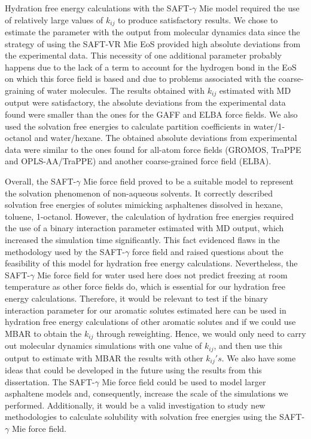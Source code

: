 Hydration free energy calculations with the SAFT-$\gamma$ Mie model required the use of relatively large values of $k_{ij}$ to produce satisfactory results. We chose to estimate the parameter with the output from molecular dynamics data since the strategy of using the SAFT-VR Mie EoS provided high absolute deviations from the experimental data. This necessity of one additional parameter probably happens due to the lack of a term to account for the hydrogen bond in the EoS on which this force field is based and due to problems associated with the coarse-graining of water molecules. The results obtained with $k_{ij}$ estimated with MD output were satisfactory, the absolute deviations from the experimental data found were smaller than the ones for the GAFF and ELBA force fields. We also used the solvation free energies to calculate partition coefficients in water/1-octanol and water/hexane. The obtained absolute deviations from experimental data were similar to the ones found for all-atom force fields (GROMOS, TraPPE and OPLS-AA/TraPPE) and another coarse-grained force field (ELBA).

Overall, the SAFT-$\gamma$ Mie force field proved to be a suitable model to represent the solvation phenomenon of non-aqueous solvents. It correctly described solvation free energies of solutes mimicking asphaltenes dissolved in hexane, toluene, 1-octanol. However, the calculation of hydration free energies required the use of a binary interaction parameter estimated with MD output, which increased the simulation time significantly. This fact evidenced flaws in the methodology used by the SAFT-$\gamma$ force field and raised questions about the feasibility of this model for hydration free energy calculations. Nevertheless, the SAFT-$\gamma$ Mie force field for water used here does not predict freezing at room temperature as other force fields do, which is essential for our hydration free energy calculations. Therefore, it would be relevant to test if the binary interaction parameter for our aromatic solutes estimated here can be used in hydration free energy calculations of other aromatic solutes and if we could use MBAR to obtain the $k_{ij}$ through reweighting. Hence, we would only need to carry out molecular dynamics simulations with one value of $k_{ij}$, and then use this output to estimate with MBAR the results with other $k_{ij} 's $. We also have some ideas that could be developed in the future using the results from this dissertation. The SAFT-$\gamma$ Mie force field could be used to model larger asphaltene models and, consequently, increase the scale of the simulations we performed. Additionally, it would be a valid investigation to study new methodologies to calculate solubility with solvation free energies using the SAFT-$\gamma$ Mie force field.


